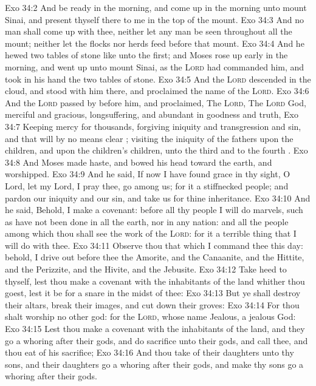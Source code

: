 \vs Exo 34:2 And be ready in the morning, and come up in the morning unto mount Sinai, and present thyself there to me in the top of the mount.
\vs Exo 34:3 And no man shall come up with thee, neither let any man be seen throughout all the mount; neither let the flocks nor herds feed before that mount.
\vs Exo 34:4 And he hewed two tables of stone like unto the first; and Moses rose up early in the morning, and went up unto mount Sinai, as the \textsc{Lord} had commanded him, and took in his hand the two tables of stone.
\vs Exo 34:5 And the \textsc{Lord} descended in the cloud, and stood with him there, and proclaimed the name of the \textsc{Lord}.
\vs Exo 34:6 And the \textsc{Lord} passed by before him, and proclaimed, The \textsc{Lord}, The \textsc{Lord} God, merciful and gracious, longsuffering, and abundant in goodness and truth,
\vs Exo 34:7 Keeping mercy for thousands, forgiving iniquity and transgression and sin, and that will by no means clear ; visiting the iniquity of the fathers upon the children, and upon the children's children, unto the third and to the fourth .
\vs Exo 34:8 And Moses made haste, and bowed his head toward the earth, and worshipped.
\vs Exo 34:9 And he said, If now I have found grace in thy sight, O Lord, let my Lord, I pray thee, go among us; for it  a stiffnecked people; and pardon our iniquity and our sin, and take us for thine inheritance.
\vs Exo 34:10 And he said, Behold, I make a covenant: before all thy people I will do marvels, such as have not been done in all the earth, nor in any nation: and all the people among which thou  shall see the work of the \textsc{Lord}: for it  a terrible thing that I will do with thee.
\vs Exo 34:11 Observe thou that which I command thee this day: behold, I drive out before thee the Amorite, and the Canaanite, and the Hittite, and the Perizzite, and the Hivite, and the Jebusite.
\vs Exo 34:12 Take heed to thyself, lest thou make a covenant with the inhabitants of the land whither thou goest, lest it be for a snare in the midst of thee:
\vs Exo 34:13 But ye shall destroy their altars, break their images, and cut down their groves:
\vs Exo 34:14 For thou shalt worship no other god: for the \textsc{Lord}, whose name  Jealous,  a jealous God:
\vs Exo 34:15 Lest thou make a covenant with the inhabitants of the land, and they go a whoring after their gods, and do sacrifice unto their gods, and  call thee, and thou eat of his sacrifice;
\vs Exo 34:16 And thou take of their daughters unto thy sons, and their daughters go a whoring after their gods, and make thy sons go a whoring after their gods.
